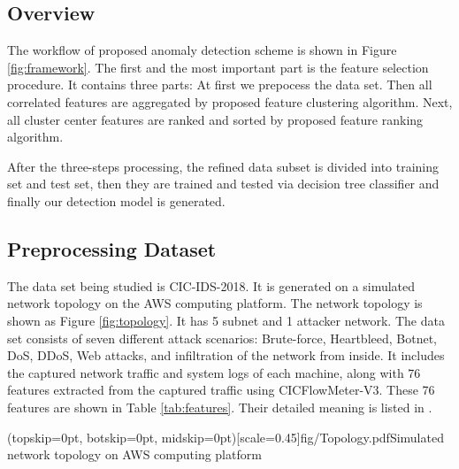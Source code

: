 \documentclass{ieeeaccess}
\theoremstyle{definition}
\begin{document}
\subsection{Overview}

The workflow of proposed anomaly detection scheme is shown in Figure \ref{fig:framework}.
The first and the most important part is the feature selection procedure. It contains three parts: At first we prepocess the data set. Then all correlated features are aggregated by proposed feature clustering algorithm. Next, all cluster center features are ranked and sorted by proposed feature ranking algorithm.

After the three-steps processing, the refined data subset is divided into training set and test set, then they are trained and tested via decision tree classifier and finally our detection model is generated. 

\subsection{Preprocessing Dataset}

The data set being studied is CIC-IDS-2018\cite{cic2018}.
It is generated on a simulated network topology on the AWS computing platform. The network topology is shown as Figure \ref{fig:topology}. It has 5 subnet and 1 attacker network.
The data set consists of seven different attack scenarios: Brute-force, Heartbleed, Botnet, DoS, DDoS, Web attacks, and infiltration of the network from inside. It includes the captured network traffic and system logs of each machine, along with 76 features extracted from the captured traffic using CICFlowMeter-V3\cite{cicflowmeter}. These 76 features are shown in Table \ref{tab:features}. Their detailed meaning is listed in \cite{cic2018}.

\Figure[!htpb](topskip=0pt, botskip=0pt, midskip=0pt)[scale=0.45]{fig/Topology.pdf}{Simulated network topology on AWS computing platform\label{fig:topology}}
\end{document}
